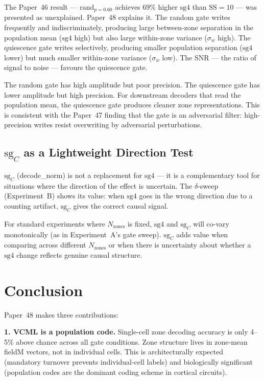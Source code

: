 \documentclass[11pt,a4paper]{article}
\begin{document}
The Paper~46 result --- $\mathrm{rand}_{p=0.60}$ achieves 69\% higher
$\mathrm{sg4}$ than $\mathrm{SS}{=}10$ --- was presented as unexplained.
Paper~48 explains it.  The random gate writes frequently and indiscriminately,
producing large between-zone separation in the population mean ($\mathrm{sg4}$
high) but also large within-zone variance ($\sigma_w$ high).  The quiescence
gate writes selectively, producing smaller population separation ($\mathrm{sg4}$
lower) but much smaller within-zone variance ($\sigma_w$ low).  The SNR --- the
ratio of signal to noise --- favours the quiescence gate.

The random gate has high amplitude but poor precision.  The quiescence gate
has lower amplitude but high precision.  For downstream decoders that read
the population mean, the quiescence gate produces cleaner zone representations.
This is consistent with the Paper~47 finding that the gate is an adversarial
filter: high-precision writes resist overwriting by adversarial perturbations.

\subsection{$\mathrm{sg}_C$ as a Lightweight Direction Test}

$\mathrm{sg}_C$ (decode\_norm) is not a replacement for $\mathrm{sg4}$ ---
it is a complementary tool for situations where the direction of the effect is
uncertain.  The $\delta$-sweep (Experiment~B) shows its value: when $\mathrm{sg4}$
goes in the wrong direction due to a counting artifact, $\mathrm{sg}_C$ gives
the correct causal signal.

For standard experiments where $N_\text{zones}$ is fixed, $\mathrm{sg4}$ and
$\mathrm{sg}_C$ will co-vary monotonically (as in Experiment~A's gate sweep).
$\mathrm{sg}_C$ adds value when comparing across different $N_\text{zones}$
or when there is uncertainty about whether a $\mathrm{sg4}$ change reflects
genuine causal structure.

\section{Conclusion}

Paper~48 makes three contributions:

\textbf{1. VCML is a population code.}  Single-cell zone decoding accuracy is
only 4--5\% above chance across all gate conditions.  Zone structure lives in
zone-mean fieldM vectors, not in individual cells.  This is architecturally
expected (mandatory turnover prevents individual-cell labels) and biologically
significant (population codes are the dominant coding scheme in cortical circuits).
\end{document}
